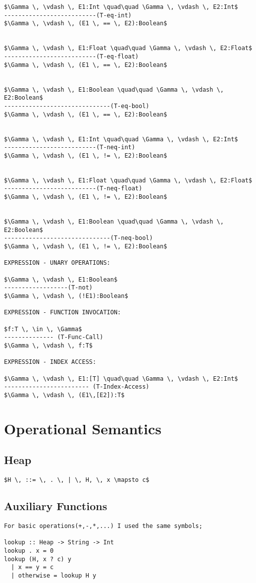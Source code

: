 \documentclass[11pt, a4paper]{article}
\begin{document}
\begin{lstlisting}
$\Gamma \, \vdash \, E1:Int \quad\quad \Gamma \, \vdash \, E2:Int$
--------------------------(T-eq-int)
$\Gamma \, \vdash \, (E1 \, == \, E2):Boolean$


$\Gamma \, \vdash \, E1:Float \quad\quad \Gamma \, \vdash \, E2:Float$
--------------------------(T-eq-float)
$\Gamma \, \vdash \, (E1 \, == \, E2):Boolean$


$\Gamma \, \vdash \, E1:Boolean \quad\quad \Gamma \, \vdash \, E2:Boolean$
------------------------------(T-eq-bool)
$\Gamma \, \vdash \, (E1 \, == \, E2):Boolean$


$\Gamma \, \vdash \, E1:Int \quad\quad \Gamma \, \vdash \, E2:Int$
--------------------------(T-neq-int)
$\Gamma \, \vdash \, (E1 \, != \, E2):Boolean$


$\Gamma \, \vdash \, E1:Float \quad\quad \Gamma \, \vdash \, E2:Float$
--------------------------(T-neq-float)
$\Gamma \, \vdash \, (E1 \, != \, E2):Boolean$


$\Gamma \, \vdash \, E1:Boolean \quad\quad \Gamma \, \vdash \, E2:Boolean$
------------------------------(T-neq-bool)
$\Gamma \, \vdash \, (E1 \, != \, E2):Boolean$

EXPRESSION - UNARY OPERATIONS:

$\Gamma \, \vdash \, E1:Boolean$
------------------(T-not)
$\Gamma \, \vdash \, (!E1):Boolean$

EXPRESSION - FUNCTION INVOCATION:

$f:T \, \in \, \Gamma$
-------------- (T-Func-Call)
$\Gamma \, \vdash \, f:T$

EXPRESSION - INDEX ACCESS:

$\Gamma \, \vdash \, E1:[T] \quad\quad \Gamma \, \vdash \, E2:Int$
------------------------ (T-Index-Access)
$\Gamma \, \vdash \, (E1\,[E2]):T$
\end{lstlisting}
\section{Operational Semantics}
\subsection*{Heap}
\begin{lstlisting}
$H \, ::= \, . \, | \, H, \, x \mapsto c$
\end{lstlisting}
\subsection*{Auxiliary Functions}
\begin{lstlisting}
For basic operations(+,-,*,...) I used the same symbols;

lookup :: Heap -> String -> Int
lookup . x = 0
lookup (H, x ? c) y
  | x == y = c
  | otherwise = lookup H y
\end{lstlisting}
\end{document}
